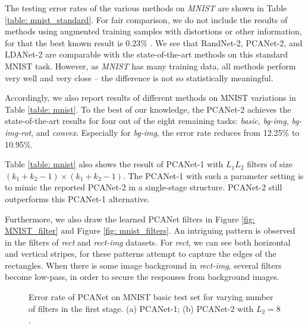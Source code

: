 \documentclass[10pt,journal,compsoc]{IEEEtran}
\begin{document}
The testing error rates of the various methods on {\it MNIST} are shown in Table \ref{table: mnist_standard}. For fair comparison, we do not include the results of methods using augmented training samples with distortions or other information, for that the best known result is 0.23$\%$ \cite{Ciresan2012}. We see that RandNet-2, PCANet-2, and LDANet-2 are comparable with the state-of-the-art methods on this standard MNIST task.
However, as {\em MNIST} has many training data, all methods perform very well and very close -- the difference is not so statistically meaningful.

Accordingly, we also report results of different methods on MNIST variations in Table \ref{table: mnist}. To the best of our knowledge, the PCANet-2 achieves the state-of-the-art results for four out of the eight remaining tasks: {\it basic}, {\it bg-img}, {\it bg-img-rot}, and {\it convex}. Especially for {\it bg-img}, the error rate reduces from 12.25$\%$ \cite{Sohn2013} to 10.95$\%$.

Table \ref{table: mnist} also shows the result of PCANet-1 with $L_1L_2$ filters of size $(k_1 + k_2 -1) \times (k_1 + k_2 -1)$. The PCANet-1 with such a parameter setting is to mimic the reported PCANet-2 in a single-stage structure. PCANet-2 still outperforms this PCANet-1 alternative.

Furthermore, we also draw the learned PCANet filters in Figure \ref{fig: MNIST_filter} and Figure \ref{fig: mnist_filters}. An intriguing pattern is observed in the filters of {\em rect} and {\em rect-img} datasets. For {\em rect}, we can see both horizontal and vertical stripes, for these patterns attempt to capture the edges of the rectangles. When there is some image background in {\em rect-img}, several filters become low-pass, in order to secure the responses from background images.


\begin{figure}[t]
\centering
{}\hspace{0cm} 
\caption{Error rate of PCANet on MNIST basic test set for varying number of filters in the first stage. (a) PCANet-1; (b) PCANet-2 with $L_2 = 8$.}\label{fig: mnist_basic_num_filters}
\end{figure}
\end{document}
